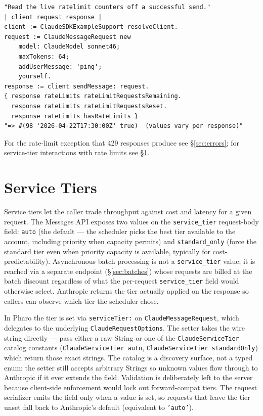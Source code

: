 \documentclass[a4paper,10pt,fleqn]{article}
\begin{document}
\begin{lstlisting}[language={}]
"Read the live ratelimit counters off a successful send."
| client request response |
client := ClaudeSDKExampleSupport resolveClient.
request := ClaudeMessageRequest new
    model: ClaudeModel sonnet46;
    maxTokens: 64;
    addUserMessage: 'ping';
    yourself.
response := client sendMessage: request.
{ response rateLimits rateLimitRequestsRemaining.
  response rateLimits rateLimitRequestsReset.
  response rateLimits hasRateLimits }
"=> #(98 '2026-04-22T17:30:00Z' true)  (values vary per response)"
\end{lstlisting}

For the rate-limit exception that 429 responses produce see
\S\ref{sec:errors}; for service-tier interactions with rate limits
see \S\ref{sec:service-tiers}.

\medskip
{}

\section{Service Tiers}
\label{sec:service-tiers}

Service tiers let the caller trade throughput against cost and
latency for a given request.  The Messages API exposes two values
on the \texttt{service\_tier} request-body field: \texttt{auto} (the
default --- the scheduler picks the best tier available to the
account, including priority when capacity permits) and
\texttt{standard\_only} (force the standard tier even when priority
capacity is available, typically for cost-predictability).
Asynchronous batch processing is not a \texttt{service\_tier} value;
it is reached via a separate endpoint (\S\ref{sec:batches}) whose
requests are billed at the batch discount regardless of what the
per-request \texttt{service\_tier} field would otherwise select.
Anthropic returns the tier actually applied on the response so
callers can observe which tier the scheduler chose.

In Pharo the tier is set via \texttt{serviceTier:} on
\texttt{ClaudeMessageRequest}, which delegates to the underlying
\texttt{ClaudeRequestOptions}.  The setter takes the wire string
directly --- pass either a raw String or one of the
\texttt{ClaudeServiceTier} catalog constants
(\texttt{ClaudeServiceTier auto},
\texttt{ClaudeServiceTier standardOnly}) which return those exact
strings.  The catalog is a discovery surface, not a typed enum:
the setter still accepts arbitrary Strings so unknown values flow
through to Anthropic if it ever extends the field.  Validation is
deliberately left to the server because client-side enforcement
would lock out forward-compat tiers.  The request serializer emits
the field only when a value is set, so requests that leave the tier
unset fall back to Anthropic's default (equivalent to
\texttt{'auto'}).
\end{document}
